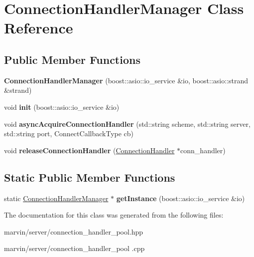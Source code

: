 \hypertarget{class_connection_handler_manager}{}\section{Connection\+Handler\+Manager Class Reference}
\label{class_connection_handler_manager}
\subsection*{Public Member Functions}
\begin{DoxyCompactItemize}
\item 
\mbox{\label{class_connection_handler_manager_a3c6a65fe45c3574fbb816224233032ae}} 
{\bfseries Connection\+Handler\+Manager} (boost\+::asio\+::io\+\_\+service \&io, boost\+::asio\+::strand \&strand)
\item 
\mbox{\label{class_connection_handler_manager_a41e753bd06b7248fe6f4adebbe2eec05}} 
void {\bfseries init} (boost\+::asio\+::io\+\_\+service \&io)
\item 
\mbox{\label{class_connection_handler_manager_a690c04e4c29cf92649148e4e03b6473e}} 
void {\bfseries async\+Acquire\+Connection\+Handler} (std\+::string scheme, std\+::string server, std\+::string port, Connect\+Callback\+Type cb)
\item 
\mbox{\label{class_connection_handler_manager_a5931179ee0b6c4955977aa52d36f4407}} 
void {\bfseries release\+Connection\+Handler} (\hyperlink{class_connection_handler}{Connection\+Handler} $\ast$conn\+\_\+handler)
\end{DoxyCompactItemize}
\subsection*{Static Public Member Functions}
\begin{DoxyCompactItemize}
\item 
\mbox{\label{class_connection_handler_manager_aaf3d518a261232e67ea9ff2460f67582}} 
static \hyperlink{class_connection_handler_manager}{Connection\+Handler\+Manager} $\ast$ {\bfseries get\+Instance} (boost\+::asio\+::io\+\_\+service \&io)
\end{DoxyCompactItemize}


The documentation for this class was generated from the following files\+:\begin{DoxyCompactItemize}
\item 
marvin/server/connection\+\_\+handler\+\_\+pool.\+hpp\item 
marvin/server/connection\+\_\+handler\+\_\+pool .\+cpp\end{DoxyCompactItemize}
